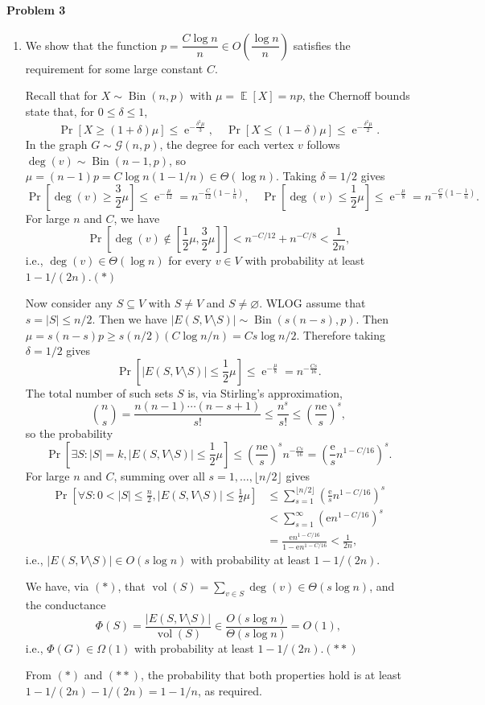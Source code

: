 \documentclass[12pt]{article}
\DeclareMathOperator{\vol}{vol}
\DeclareMathOperator{\e}{e}
\DeclareMathOperator{\E}{\mathbb{E}}
\DeclareMathOperator{\Bin}{Bin}
\begin{document}
\paragraph{Problem 3}
\begin{enumerate}
\item
We show that the function $p=\dfrac{C\log n}{n}\in O\left(\dfrac{\log n}{n}\right)$ satisfies the requirement for some large constant $C$.

Recall that for $X\sim\Bin(n, p)$ with $\mu=\E[X]=np$, the Chernoff bounds state that, for $0\le\delta\le1$,
$$\Pr[X\ge(1+\delta)\mu]\le\e^{-\frac{\delta^2\mu}{3}},\quad\Pr[X\le(1-\delta)\mu]\le\e^{-\frac{\delta^2\mu}{2}}.$$
In the graph $G\sim\mathcal{G}(n,p)$, the degree for each vertex $v$ follows $\deg(v)\sim\Bin(n-1,p)$, so $\mu=(n-1)p=C\log n(1-1/n)\in\Theta(\log n)$. Taking $\delta=1/2$ gives
$$\Pr\left[\deg(v)\ge\frac 3 2\mu\right]\le\e^{-\frac{\mu}{12}}=n^{-\frac{C}{12}\left(1-\frac 1 n\right)},\quad\Pr\left[\deg(v)\le\frac 1 2\mu\right]\le\e^{-\frac{\mu}{8}}=n^{-\frac{C}{8}\left(1-\frac 1 n\right)}.$$
For large $n$ and $C$, we have
$$\Pr\left[\deg(v)\not\in\left[\frac 1 2\mu, \frac 3 2\mu\right]\right]< n^{-C/12}+n^{-C/8}<\frac{1}{2n},$$
i.e., $\deg(v)\in\Theta(\log n)$ for every $v\in V$ with probability at least $1-1/(2n)$.\hfill$(*)$

Now consider any $S\subseteq V$ with $S\ne V$ and $S\ne\varnothing$. WLOG assume that $s=|S|\le n/2$. Then we have $|E(S,V\setminus S)|\sim\Bin(s(n-s),p)$. Then $\mu=s(n-s)p\ge s(n/2)(C\log n/n)=Cs\log n/2.$
Therefore taking $\delta=1/2$ gives
$$\Pr\left[|E(S,V\setminus S)|\le\frac{1}{2}\mu\right]\le\e^{-\frac{\mu}{8}}=n^{-\frac{Cs}{16}}.$$
The total number of such sets $S$ is, via Stirling's approximation, $$\binom{n}{s}=\frac{n(n-1)\cdots(n-s+1)}{s!}\le\frac{n^s}{s!}\le\left(\frac{n\mathrm{e}}{s}\right)^s,$$
so the probability
$$\Pr\left[\exists S:|S|=k, |E(S,V\setminus S)|\le\frac{1}{2}\mu\right]\le\left(\frac{n\mathrm{e}}{s}\right)^sn^{-\frac{Cs}{16}}=\left(\frac{\mathrm{e}}{s}n^{1-C/16}\right)^s.$$
For large $n$ and $C$, summing over all $s=1,\dots,\lfloor n/2\rfloor$ gives
\begin{align*}
\Pr\left[\forall S:0<|S|\le\frac n 2, |E(S,V\setminus S)|\le\frac{1}{2}\mu\right]&\le\sum_{s=1}^{\lfloor n/2\rfloor}\left(\frac{\mathrm{e}}{s}n^{1-C/16}\right)^s\\
&<\sum_{s=1}^{\infty}\left(\mathrm{e}n^{1-C/16}\right)^s\\
&=\frac{\mathrm{e}n^{1-C/16}}{1-\mathrm{e}n^{1-C/16}}<\frac{1}{2n},
\end{align*}
i.e., $|E(S, V\setminus S)|\in O(s\log n)$ with probability at least $1-1/(2n)$.

We have, via $(*)$, that $\vol(S)=\sum_{v\in S}\deg(v)\in\Theta(s\log n)$, and the conductance
$$\Phi(S)=\frac{|E(S,V\setminus S)|}{\vol(S)}\in\frac{O(s\log n)}{\Theta(s\log n)}=O(1),$$
i.e., $\Phi(G)\in\Omega(1)$ with probability at least $1-1/(2n)$.\hfill$(**)$

From $(*)$ and $(**)$, the probability that both properties hold is at least $1-1/(2n)-1/(2n)=1-1/n$, as required.
\end{enumerate}
\end{document}
